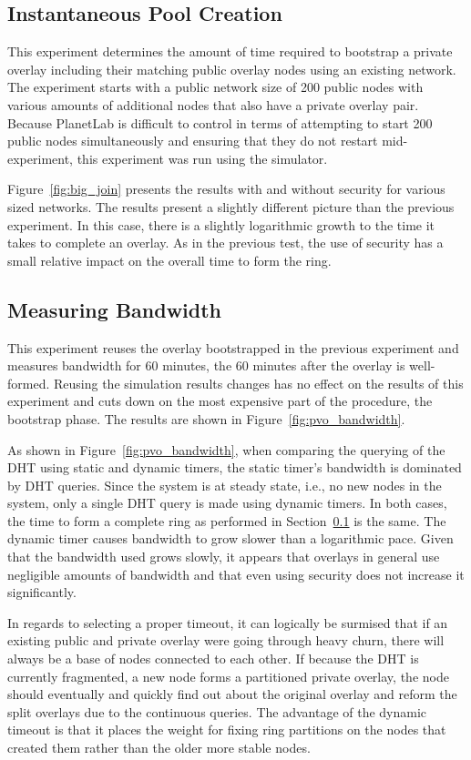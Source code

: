 \subsection{Instantaneous Pool Creation}
\label{mass_join}
This experiment determines the amount of time required to bootstrap a private
overlay including their matching public overlay nodes using an existing network.
The experiment starts with a public network size of 200 public nodes with
various amounts of additional nodes that also have a private overlay pair.
Because PlanetLab is difficult to control in terms of attempting to start 200
public nodes simultaneously and ensuring that they do not restart
mid-experiment, this experiment was run using the simulator.  

Figure~\ref{fig:big_join} presents the results with and without security for
various sized networks.  The results present a slightly different picture than
the previous experiment.  In this case, there is a slightly logarithmic growth
to the time it takes to complete an overlay.  As in the previous test, the use
of security has a small relative impact on the overall time to form the ring.

\subsection{Measuring Bandwidth}
This experiment reuses the overlay bootstrapped in the previous experiment and
measures bandwidth for 60 minutes, the 60 minutes after the overlay is
well-formed.  Reusing the simulation results changes has no effect on the
results of this experiment and cuts down on the most expensive part of the
procedure, the bootstrap phase.  The results are shown in
Figure~\ref{fig:pvo_bandwidth}.

As shown in Figure~\ref{fig:pvo_bandwidth}, when comparing the querying of the DHT
using static and dynamic timers, the static timer's bandwidth is dominated by
DHT queries.  Since the system is at steady state, i.e., no new nodes in the
system, only a single DHT query is made using dynamic timers.  In both cases,
the time to form a complete ring as performed in Section~\ref{mass_join} is the
same. The dynamic timer causes bandwidth to grow slower than a logarithmic pace.
Given that the bandwidth used grows slowly, it appears that overlays in general
use negligible amounts of bandwidth and that even using security does not
increase it significantly.

In regards to selecting a proper timeout, it can logically be surmised that
if an existing public and private overlay were going through heavy churn,
there will always be a base of nodes connected to each other.  If because the DHT
is currently fragmented, a new node forms a partitioned private overlay, the node
should eventually and quickly find out about the original overlay and reform
the split overlays due to the continuous queries.  The advantage of the dynamic
timeout is that it places the weight for fixing ring partitions
on the nodes that created them rather than the older more stable nodes. 

